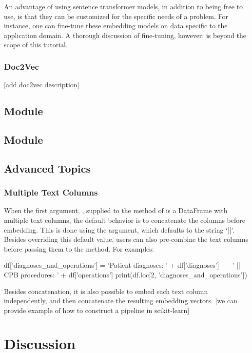 \documentclass[article]{jss}
\begin{document}
An advantage of using sentence transformer models, in addition to being free to use, is that they can be customized for the specific needs of a problem. For instance, one can fine-tune these embedding models on data specific to the application domain. A thorough discussion of fine-tuning, however, is beyond the scope of this tutorial.

\subsubsection{Doc2Vec}\label{subsubsec:using-embed-doc2vec}

[add doc2vec description]

\subsection[cluster Module]{ Module}\label{subsec:using-cluster}

\subsection[explain Module]{ Module}\label{subsec:using-explain}

\subsection[Advanced Topics]{Advanced Topics}\label{subsec:using-advanced}

\subsubsection[Multiple Text Columns]{Multiple Text Columns}\label{subsubsec:using-multiple-columns}

When the first argument, , supplied to the  method of  is a DataFrame with multiple text columns, the default behavior is to concatenate the columns before embedding. This is done using the  argument, which defaults to the string `||'. Besides overriding this default value, users can also pre-combine the text columns before passing them to the  method. For examples:
\begin{pyblock}
df['diagnoses_and_operations'] = 'Patient diagnoses: ' + df['diagnoses'] + \ 
  ' || CPB procedures: ' + df['operations']
print(df.loc[2, 'diagnoses_and_operations'])
\end{pyblock}
\stdoutpythontex %

Besides concatenation, it is also possible to embed each text column independently, and then concatenate the resulting embedding vectors. [we can provide example of how to construct a pipeline in scikit-learn]

\section[Discussion]{Discussion} \label{sec:discussion}


\end{document}
